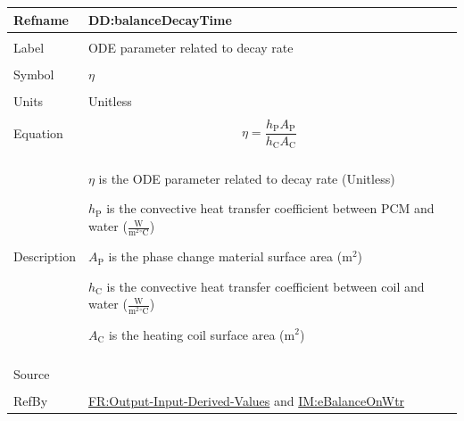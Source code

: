 \documentclass[12pt]{article}
\begin{document}
\vspace{\baselineskip}
\noindent
\begin{minipage}{\textwidth}
\begin{tabular}{>{\raggedright}p{}>{\raggedright\arraybackslash}p{}}
\toprule \textbf{Refname} & \textbf{DD:balanceDecayTime}
\label{DD:balanceDecayTime}
\\ \midrule \\
Label & ODE parameter related to decay rate
        
\\ \midrule \\
Symbol & $η$
         
\\ \midrule \\
Units & Unitless
        
\\ \midrule \\
Equation & \begin{displaymath}
           η=\frac{{h_{\text{P}}} {A_{\text{P}}}}{{h_{\text{C}}} {A_{\text{C}}}}
           \end{displaymath}
\\ \midrule \\
Description & \begin{symbDescription}
              \item{$η$ is the ODE parameter related to decay rate (Unitless)}
              \item{${h_{\text{P}}}$ is the convective heat transfer coefficient between PCM and water ($\frac{\text{W}}{\text{m}^{2}{}^{\circ}\text{C}}$)}
              \item{${A_{\text{P}}}$ is the phase change material surface area (${\text{m}^{2}}$)}
              \item{${h_{\text{C}}}$ is the convective heat transfer coefficient between coil and water ($\frac{\text{W}}{\text{m}^{2}{}^{\circ}\text{C}}$)}
              \item{${A_{\text{C}}}$ is the heating coil surface area (${\text{m}^{2}}$)}
              \end{symbDescription}
\\ \midrule \\
Source & \cite{koothoor2013}
         
\\ \midrule \\
RefBy & \hyperref[outputInputDerivVals]{FR:Output-Input-Derived-Values} and \hyperref[IM:eBalanceOnWtr]{IM:eBalanceOnWtr}
        
\\ \bottomrule
\end{tabular}
\end{minipage}
\end{document}
